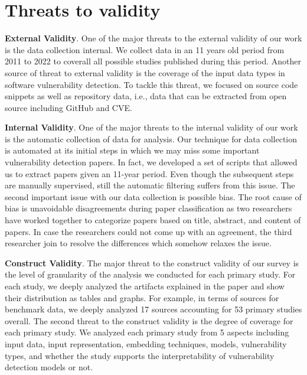 \section{Threats to validity}
\noindent \textbf{External Validity}.
One of the major threats to the external validity of our work is the data collection internal. We collect data in an 11 years old period from 2011 to 2022 to coverall all possible studies published during this period. Another source of threat to external validity is the coverage of the input data types in software vulnerability detection. To tackle this threat, we focused on source code snippets as well as repository data, i.e., data that can be extracted from open source including GitHub and CVE. 

\noindent \textbf{Internal Validity}. 
One of the major threats to the internal validity of our work is the automatic collection of data for analysis. Our technique for data collection is automated at its initial steps in which we may miss some important vulnerability detection papers. In fact, we developed a set of scripts that allowed us to extract papers given an 11-year period. Even though the subsequent steps are manually supervised, still the automatic filtering suffers from this issue. The second important issue with our data collection is possible bias. The root cause of bias is unavoidable disagreements during paper classification as two researchers have worked together to categorize papers based on title, abstract, and content of papers. In case the researchers could not come up with an agreement, the third researcher join to resolve the differences which somehow relaxes the issue. 

\noindent \textbf{Construct Validity}. The major threat to the construct validity of our survey is the level of granularity of the analysis we conducted for each primary study. For each study, we deeply analyzed the artifacts explained in the paper and show their distribution as tables and graphs. For example, in terms of sources for benchmark data, we deeply analyzed 17 sources accounting for 53 primary studies overall. The second threat to the construct validity is the degree of coverage for each primary study. We analyzed each primary study from 5 aspects including input data, input representation, embedding techniques, models, vulnerability types, and whether the study supports the interpretability of vulnerability detection models or not.  


